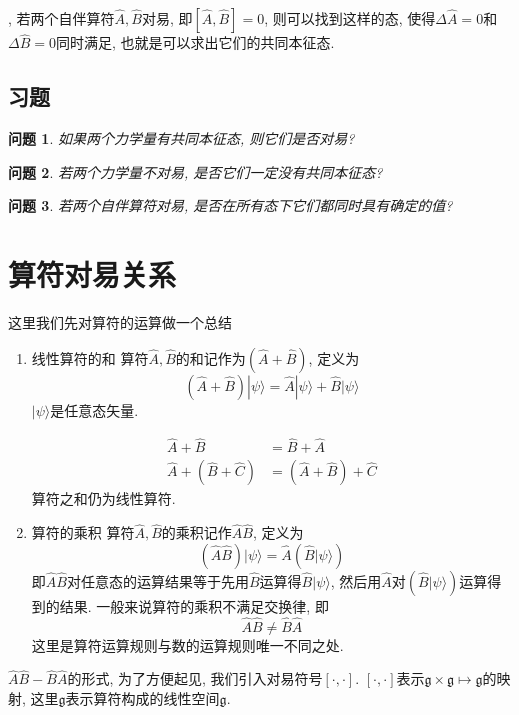 \documentclass[a4paper,11pt]{book}
\newtheorem{problem}{问题}[section]
\newcommand{\A}{\hat{A}}
\newcommand{\B}{\hat{B}}
\newcommand{\hC}{\hat{C}}
\begin{document}
, 若两个自伴算符$\A,\B$对易, 即$[\A,\B]=0$, 则可以找到这样的态, 使得$\Delta\A=0$和$\Delta\B=0$同时满足, 也就是可以求出它们的共同本征态.\
\subsection{习题}
\begin{problem}
  如果两个力学量有共同本征态, 则它们是否对易?
\end{problem}
\begin{problem}
  若两个力学量不对易, 是否它们一定没有共同本征态?
\end{problem}
\begin{problem}
  若两个自伴算符对易, 是否在所有态下它们都同时具有确定的值?
\end{problem}
\section{算符对易关系}
这里我们先对算符的运算做一个总结
\begin{enumerate}
  \item 线性算符的和
  算符$\A,\B$的和记作为$(\A+\B)$, 定义为
  \begin{equation*}
    (\A+\B)|\psi\rangle=\A|\psi\rangle+\B|\psi\rangle
  \end{equation*}
  $|\psi\rangle$是任意态矢量.

  \begin{equation*}
    \begin{split}
       \A+\B&=\B+\A\\
       \A+(\B+\hC)&=(\A+\B)+\hC
    \end{split}
  \end{equation*}
  算符之和仍为线性算符.
  \item 算符的乘积
  算符$\A,\B$的乘积记作$\A\B$, 定义为
  \begin{equation*}
    (\A\B)|\psi\rangle=\A(\B|\psi\rangle)
  \end{equation*}
  即$\A\B$对任意态的运算结果等于先用$\B$运算得$\B|\psi\rangle$, 然后用$\A$对$(\B|\psi\rangle)$运算得到的结果. 一般来说算符的乘积不满足交换律, 即
  \begin{equation*}
    \A\B\neq\B\A
  \end{equation*}
  这里是算符运算规则与数的运算规则唯一不同之处.
\end{enumerate}

$\A\B-\B\A$的形式, 为了方便起见, 我们引入对易符号$[\cdot,\cdot]$. $[\cdot,\cdot]$表示$\mathfrak{g}\times \mathfrak{g}\mapsto \mathfrak{g}$的映射, 这里$\mathfrak{g}$表示算符构成的线性空间$\mathfrak{g}$.
\end{document}
